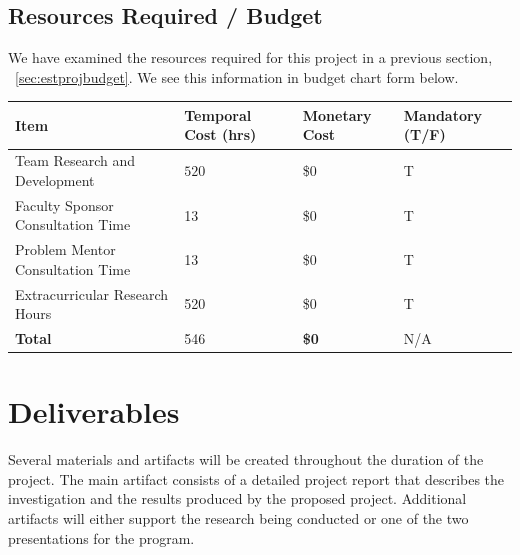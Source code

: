 \documentclass[11pt]{article}
\begin{document}
\subsection{Resources Required / Budget}
We have examined the resources required for this project in a previous section, ~\ref{sec:estprojbudget}. We see this information in budget chart form below.

\begin{center}
\small
\begin{tabular}{|l|l|l|l|}
\hline
\textbf{Item} & \textbf{Temporal Cost (hrs)} & \textbf{Monetary Cost} & \textbf{Mandatory (T/F)} \\
\hline
Team Research and Development & $520$ & \$0 & T \\
Faculty Sponsor Consultation Time  & 13 & \$0 & T \\
Problem Mentor Consultation Time & 13 & \$0 & T  \\
Extracurricular Research Hours & 520\footnotemark & \$0 & T  \\
\hline
\textbf{Total} & 546\footnotemark & \textbf{\$0} & N/A \\
\hline
\end{tabular}
\end{center}


\section{Deliverables}
Several materials and artifacts will be created throughout the duration of the project. The main artifact consists of a detailed project report that describes the investigation and the results produced by the proposed project. Additional artifacts will either support the research being conducted or one of the two presentations for the program.
\end{document}
